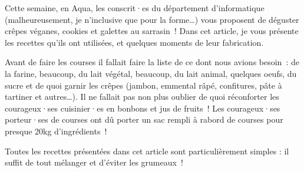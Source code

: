 
Cette semaine, en Aqua, les conscrit·es du département d'informatique (malheureusement, je n'inclusive que pour la forme\dots) vous proposent de déguster crêpes véganes, cookies et galettes au sarrasin~! Dans cet article, je vous présente les recettes qu'ils ont utilisées, et quelques moments de leur fabrication. 

Avant de faire les courses il fallait faire la liste de ce dont nous avions besoin~: de la farine, beaucoup, du lait végétal, beaucoup, du lait animal, quelques oeufs, du sucre et de quoi garnir les crêpes (jambon, emmental râpé, confitures, pâte à tartiner et autres\dots).
Il ne fallait pas non plus oublier de quoi réconforter les courageux·ses cuisinier·es en bonbons et jus de fruits~! 
Les courageux·ses porteur·ses de courses ont dû porter un sac rempli à rabord de courses pour presque 20kg d'ingrédients~!

Toutes les recettes présentées dans cet article sont particulièrement simples : il suffit de tout mélanger et d'éviter les grumeaux~!

